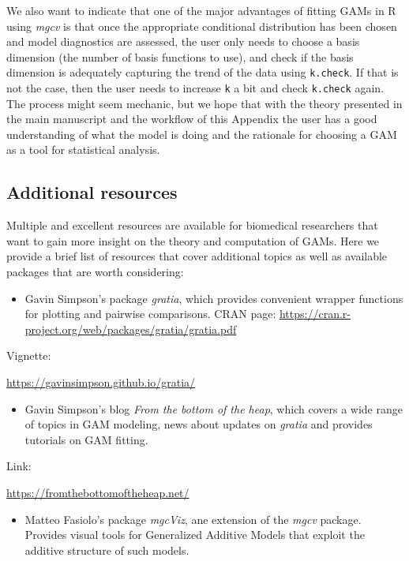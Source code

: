 \documentclass[
]{article}
\newcommand{\passthrough}[1]{#1}
\providecommand{\tightlist}{%
  \setlength{\itemsep}{0pt}\setlength{\parskip}{0pt}}
\begin{document}
We also want to indicate that one of the major advantages of fitting GAMs in R using \emph{mgcv} is that once the appropriate conditional distribution has been chosen and model diagnostics are assessed, the user only needs to choose a basis dimension (the number of basis functions to use), and check if the basis dimension is adequately capturing the trend of the data using \passthrough{\lstinline!k.check!}. If that is not the case, then the user needs to increase \passthrough{\lstinline!k!} a bit and check \passthrough{\lstinline!k.check!} again. The process might seem mechanic, but we hope that with the theory presented in the main manuscript and the workflow of this Appendix the user has a good understanding of what the model is doing and the rationale for choosing a GAM as a tool for statistical analysis.

\hypertarget{additional-resources}{%
\subsection{Additional resources}\label{additional-resources}}

Multiple and excellent resources are available for biomedical researchers that want to gain more insight on the theory and computation of GAMs. Here we provide a brief list of resources that cover additional topics as well as available packages that are worth considering:

\begin{itemize}
\tightlist
\item
  Gavin Simpson's package \emph{gratia}, which provides convenient wrapper functions for plotting and pairwise comparisons.
  CRAN page:
  \url{https://cran.r-project.org/web/packages/gratia/gratia.pdf}
\end{itemize}

Vignette:

\url{https://gavinsimpson.github.io/gratia/}

\begin{itemize}
\tightlist
\item
  Gavin Simpson's blog \emph{From the bottom of the heap}, which covers a wide range of topics in GAM modeling, news about updates on \emph{gratia} and provides tutorials on GAM fitting.
\end{itemize}

Link:

\url{https://fromthebottomoftheheap.net/}

\begin{itemize}
\tightlist
\item
  Matteo Fasiolo's package \emph{mgcViz}, ane extension of the \emph{mgcv} package. Provides visual tools for Generalized Additive Models that exploit the additive structure of such models.
\end{itemize}
\end{document}
